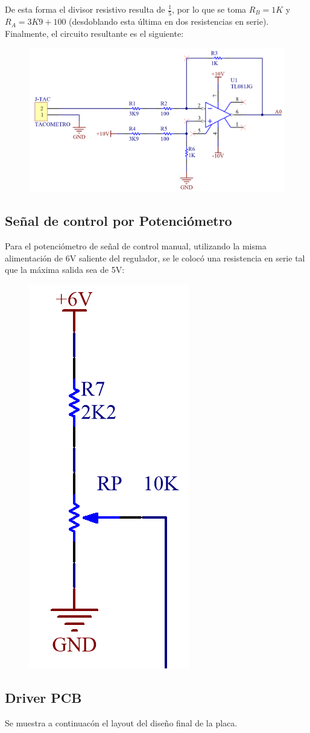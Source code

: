 \documentclass{article}
\begin{document}
De esta forma el divisor resistivo resulta de $\frac{1}{5}$, por lo que se toma $R_B = 1K$ y $R_A = 3K9 + 100$ (desdoblando esta última en dos resistencias en serie). Finalmente, el circuito resultante es el siguiente:

\begin{figure}[H]
\centering
\includegraphics[width=0.6\linewidth]{../Images/FuncionOpamp.png}
\end{figure}

\subsection{Señal de control por Potenciómetro}

Para el potenciómetro de señal de control manual, utilizando la misma alimentación de 6V saliente del regulador, se le colocó una resistencia en serie tal que la máxima salida sea de 5V:

\begin{figure}[H]
\centering
\includegraphics[width=0.1\linewidth]{../Images/PoteManual.png}
\end{figure}

\subsection{Driver PCB}
Se muestra a continuacón el layout del diseño final de la placa.
\end{document}
